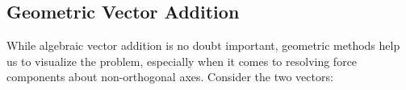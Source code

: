 \documentclass[10pt,letterpaper]{article} %
\begin{document}













\subsection{Geometric Vector Addition}
While algebraic vector addition is no doubt important, geometric methods help us to visualize the problem, especially when it comes to resolving force components about non-orthogonal axes. Consider the two vectors:

\begin{center}
\end{center}
\end{document}

